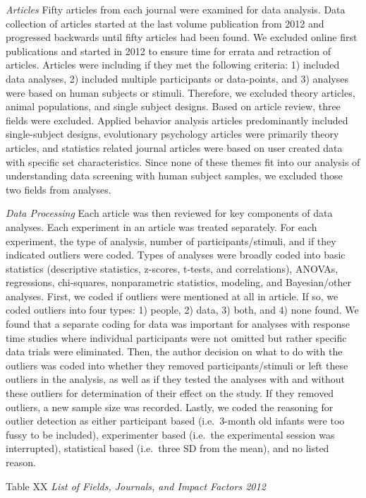 \documentclass[english,man]{apa6}
\newcounter{author}
\theoremstyle{definition}
\theoremstyle{definition}
\theoremstyle{definition}
\theoremstyle{remark}
\begin{document}
\emph{Articles} Fifty articles from each journal were examined for data
analysis. Data collection of articles started at the last volume
publication from 2012 and progressed backwards until fifty articles had
been found. We excluded online first publications and started in 2012 to
ensure time for errata and retraction of articles. Articles were
including if they met the following criteria: 1) included data analyses,
2) included multiple participants or data-points, and 3) analyses were
based on human subjects or stimuli. Therefore, we excluded theory
articles, animal populations, and single subject designs. Based on
article review, three fields were excluded. Applied behavior analysis
articles predominantly included single-subject designs, evolutionary
psychology articles were primarily theory articles, and statistics
related journal articles were based on user created data with specific
set characteristics. Since none of these themes fit into our analysis of
understanding data screening with human subject samples, we excluded
those two fields from analyses.

\emph{Data Processing} Each article was then reviewed for key components
of data analyses. Each experiment in an article was treated separately.
For each experiment, the type of analysis, number of
participants/stimuli, and if they indicated outliers were coded. Types
of analyses were broadly coded into basic statistics (descriptive
statistics, z-scores, t-tests, and correlations), ANOVAs, regressions,
chi-squares, nonparametric statistics, modeling, and Bayesian/other
analyses. First, we coded if outliers were mentioned at all in article.
If so, we coded outliers into four types: 1) people, 2) data, 3) both,
and 4) none found. We found that a separate coding for data was
important for analyses with response time studies where individual
participants were not omitted but rather specific data trials were
eliminated. Then, the author decision on what to do with the outliers
was coded into whether they removed participants/stimuli or left these
outliers in the analysis, as well as if they tested the analyses with
and without these outliers for determination of their effect on the
study. If they removed outliers, a new sample size was recorded. Lastly,
we coded the reasoning for outlier detection as either participant based
(i.e.~3-month old infants were too fussy to be included), experimenter
based (i.e.~the experimental session was interrupted), statistical based
(i.e.~three SD from the mean), and no listed reason.

Table XX \emph{List of Fields, Journals, and Impact Factors 2012}
\end{document}

